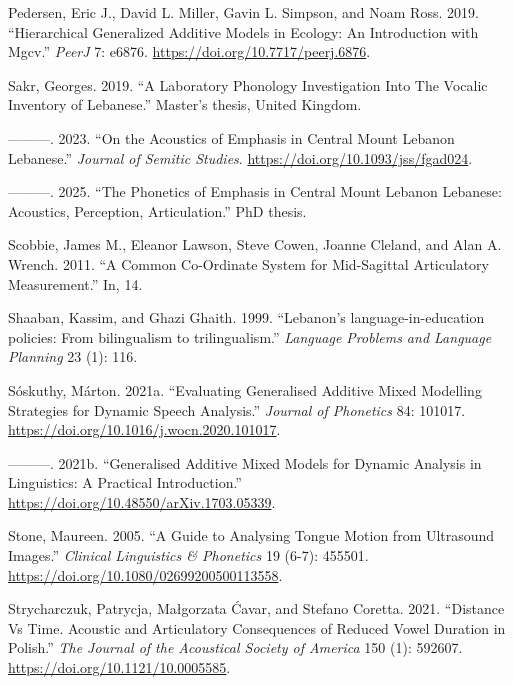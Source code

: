 \documentclass[
]{interact}
\newlength{\cslhangindent}
\newenvironment{CSLReferences}[2] %
 {\begin{list}{}{%
  \setlength{\itemindent}{0pt}
  \setlength{\leftmargin}{0pt}
  \setlength{\parsep}{0pt}
  \ifodd #1
   \setlength{\leftmargin}{\cslhangindent}
   \setlength{\itemindent}{-1\cslhangindent}
  \fi
  \setlength{\itemsep}{#2\baselineskip}}}
 {\end{list}}
\begin{document}
\begin{CSLReferences}{1}{0}
Pedersen, Eric J., David L. Miller, Gavin L. Simpson, and Noam Ross.
2019. {``Hierarchical Generalized Additive Models in Ecology: An
Introduction with Mgcv.''} \emph{PeerJ} 7: e6876.
\url{https://doi.org/10.7717/peerj.6876}.

Sakr, Georges. 2019. {``A Laboratory Phonology Investigation Into The
Vocalic Inventory of Lebanese.''} Master's thesis, United Kingdom.

---------. 2023. {``On the Acoustics of Emphasis in Central Mount
Lebanon Lebanese.''} \emph{Journal of Semitic Studies}.
\url{https://doi.org/10.1093/jss/fgad024}.

---------. 2025. {``The Phonetics of Emphasis in Central Mount Lebanon
Lebanese: Acoustics, Perception, Articulation.''} PhD thesis.

Scobbie, James M., Eleanor Lawson, Steve Cowen, Joanne Cleland, and Alan
A. Wrench. 2011. {``A Common Co-Ordinate System for Mid-Sagittal
Articulatory Measurement.''} In, 14.

Shaaban, Kassim, and Ghazi Ghaith. 1999. {``Lebanon's
language-in-education policies: From bilingualism to trilingualism.''}
\emph{Language Problems and Language Planning} 23 (1): 116.

Sóskuthy, Márton. 2021a. {``Evaluating Generalised Additive Mixed
Modelling Strategies for Dynamic Speech Analysis.''} \emph{Journal of
Phonetics} 84: 101017. \url{https://doi.org/10.1016/j.wocn.2020.101017}.

---------. 2021b. {``Generalised Additive Mixed Models for Dynamic
Analysis in Linguistics: A Practical Introduction.''}
\url{https://doi.org/10.48550/arXiv.1703.05339}.

Stone, Maureen. 2005. {``A Guide to Analysing Tongue Motion from
Ultrasound Images.''} \emph{Clinical Linguistics \& Phonetics} 19 (6-7):
455501. \url{https://doi.org/10.1080/02699200500113558}.

Strycharczuk, Patrycja, Małgorzata Ćavar, and Stefano Coretta. 2021.
{``Distance Vs Time. Acoustic and Articulatory Consequences of Reduced
Vowel Duration in Polish.''} \emph{The Journal of the Acoustical Society
of America} 150 (1): 592607. \url{https://doi.org/10.1121/10.0005585}.


\end{CSLReferences}
\end{document}

